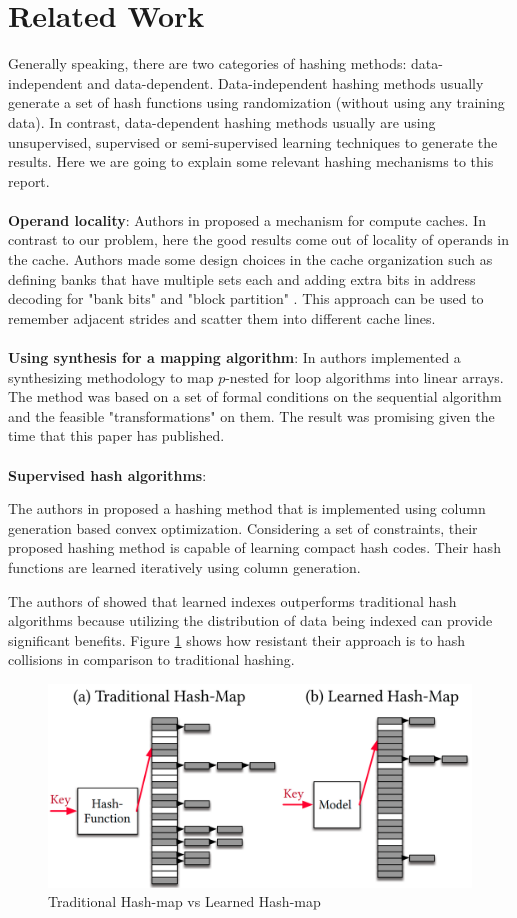 \section{Related Work}
\label{related_work}
Generally speaking, there are two categories of hashing methods: data-independent and data-dependent. Data-independent hashing methods usually generate a set of hash functions using randomization (without using any training data). In contrast,  data-dependent hashing methods usually are using unsupervised, supervised or semi-supervised learning techniques to generate the results. Here we are going to explain some relevant hashing mechanisms to this report. 
\\
~
\\
\textbf{Operand locality}: Authors in \cite{compute-caches} proposed a mechanism for compute caches. In contrast to our problem, here the good results come out of locality of operands in the cache. Authors made some design choices in the cache organization such as defining banks that
have multiple sets each and adding extra bits in address decoding for "bank bits" and "block partition" \cite{compute-caches}. This approach can be used to remember adjacent strides and scatter them into different cache lines.
\\
~
\\
\textbf{Using synthesis for a mapping algorithm}: In \cite{synthesis-map} authors implemented a synthesizing methodology to map $p$-nested for loop algorithms into linear arrays. The method was based on a set of formal conditions on the sequential algorithm and the feasible "transformations" on them. The result was promising given the time that this paper has published.
\\
~
\\
\textbf{Supervised hash algorithms}:

The authors in \cite{learning-hash} proposed a hashing method that is implemented using column generation based convex optimization. Considering a set of constraints, their proposed hashing method is capable of learning compact hash codes. Their hash functions are learned iteratively using column generation.

The authors of \cite{learning-index} showed that learned indexes outperforms traditional hash algorithms because utilizing the distribution of data being indexed can provide significant benefits. Figure \ref{fig:learned_index} shows how resistant their approach is to hash collisions in comparison to traditional hashing. 

\begin{figure}[h!]
	\includegraphics[scale=0.2]{figures/learned_index.png}
	\caption{Traditional Hash-map vs Learned Hash-map \cite{learning-index}}
	\label{fig:learned_index}
\end{figure}

\vspace{1mm}
\noindent
